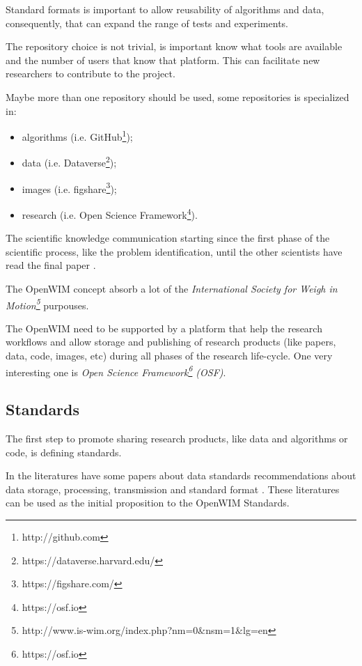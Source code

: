 \documentclass[a4paper]{article}
\begin{document}
{Standard formats is important to allow reusability of algorithms and data, consequently, that can expand the range of tests and experiments.

The repository choice is not trivial, is important know what tools are available and the number of users that know that platform. This can facilitate new researchers to contribute to the project.

Maybe more than one repository should be used, some repositories is specialized in:

\begin{itemize}
\item algorithms (i.e. GitHub\footnote{http://github.com});
\item data (i.e. Dataverse\footnote{https://dataverse.harvard.edu/});
\item images (i.e. figshare\footnote{https://figshare.com/});
\item research (i.e. Open Science Framework\footnote{https://osf.io}).
\end{itemize}

The scientific knowledge communication starting since the first phase of the scientific process, like the problem identification, until the other scientists have read the final paper \cite{leite2007scientific}.

The OpenWIM concept absorb a lot of the \textit{International Society for Weigh in Motion\footnote{http://www.is-wim.org/index.php?nm=0$\&$nsm=1$\&$lg=en}} purpouses.

The OpenWIM need to be supported by a platform that help the research workflows and allow storage and publishing of research products (like papers, data, code, images, etc) during all phases of the research life-cycle. One very interesting one is \textit{Open Science Framework\footnote{https://osf.io} (OSF)}.

\subsection{Standards}\label{standards}

The first step to promote sharing research products, like data and algorithms or code, is defining standards.

In the literatures have some papers about data standards recommendations about data storage, processing, transmission and standard format \cite{tech:cost-323, enright2011cleaning, qu1997traffic, elkins2008development}. These literatures can be used as the initial proposition to the OpenWIM Standards.

}
\end{document}
